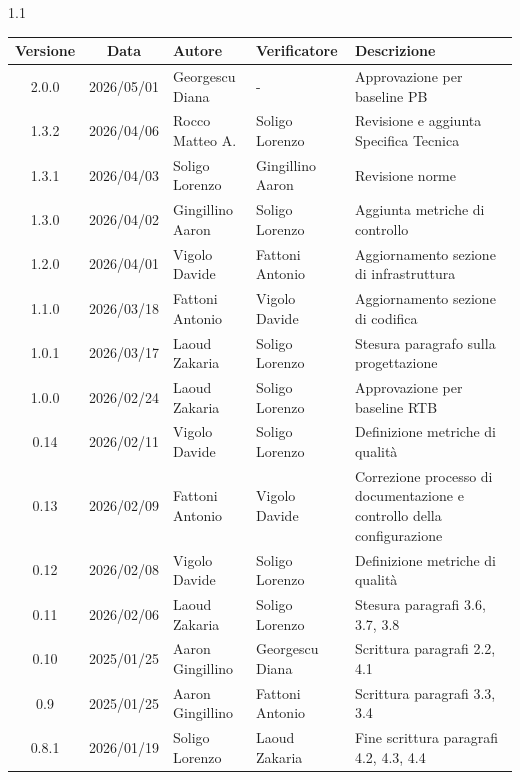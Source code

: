 \documentclass[a4paper,12pt]{article}
\begin{document}
\begin{spacing}{1.1}
    \begin{longtable}{|c|c|p{3.2cm}|p{3.2cm}|p{5cm}|}
        \hline
        \textbf{Versione} & \textbf{Data} & \textbf{Autore}  & \textbf{Verificatore} & \textbf{Descrizione} \\
        \hline
        2.0.0 & 2026/05/01 & Georgescu Diana & - & Approvazione per baseline PB \\
        \hline
        1.3.2 & 2026/04/06 & Rocco Matteo A. & Soligo Lorenzo & Revisione e aggiunta Specifica Tecnica \\
        \hline
        1.3.1 & 2026/04/03 & Soligo Lorenzo & Gingillino Aaron & Revisione norme \\
        \hline
        1.3.0 & 2026/04/02 & Gingillino Aaron & Soligo Lorenzo & Aggiunta metriche di controllo \\
        \hline
        1.2.0 & 2026/04/01 & Vigolo Davide & Fattoni Antonio & Aggiornamento sezione di infrastruttura \\
        \hline
        1.1.0 & 2026/03/18    & Fattoni Antonio & Vigolo Davide & Aggiornamento sezione di codifica \\
        \hline
        1.0.1 & 2026/03/17    & Laoud Zakaria & Soligo Lorenzo & Stesura paragrafo sulla progettazione \\
        \hline
        1.0.0 & 2026/02/24 & Laoud Zakaria & Soligo Lorenzo & Approvazione per baseline RTB \\
        \hline
        0.14 & 2026/02/11    & Vigolo Davide    & Soligo Lorenzo        & Definizione metriche di qualità \\
        \hline
        0.13 & 2026/02/09    & Fattoni Antonio  & Vigolo Davide         & Correzione processo di documentazione e controllo della configurazione \\
        \hline
        0.12 & 2026/02/08    & Vigolo Davide    & Soligo Lorenzo        & Definizione metriche di qualità \\
        \hline
        0.11 & 2026/02/06    & Laoud Zakaria    & Soligo Lorenzo        & Stesura paragrafi 3.6, 3.7, 3.8 \\
        \hline
        0.10 & 2025/01/25    & Aaron Gingillino & Georgescu Diana       & Scrittura paragrafi 2.2, 4.1 \\
        \hline
        0.9 & 2025/01/25    & Aaron Gingillino & Fattoni Antonio       & Scrittura paragrafi 3.3, 3.4 \\
        \hline
        0.8.1 & 2026/01/19 & Soligo Lorenzo   & Laoud Zakaria & Fine scrittura paragrafi 4.2, 4.3, 4.4 \\

\end{longtable}
\end{spacing}
\end{document}
